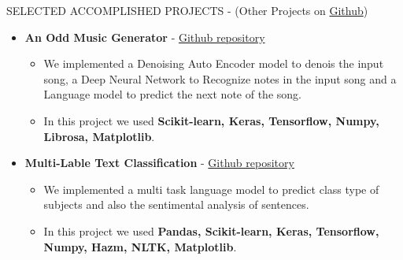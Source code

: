 \documentclass[]{CV}
\begin{document}
\begin{section}{SELECTED ACCOMPLISHED PROJECTS { - (Other Projects on \href{https://github.com/amirkasaei}{Github})}}
\begin{itemize}
\item \textbf{An Odd Music Generator} - \href{https://github.com/amirkasaei/An-Odd-Music-Generator}{Github repository}
   \begin{itemize}
        \item We implemented a Denoising Auto Encoder model to denois the input song, a Deep Neural Network to Recognize notes in the input song and a Language model to predict the next note of  the song.\vspace{-2mm}
        \item In this project we used \textbf{Scikit-learn, Keras, Tensorflow, Numpy, Librosa, Matplotlib}.
    \end{itemize} 
    
      
    
    
   \item \textbf{Multi-Lable Text Classification} - \href{https://github.com/amirkasaei/Multi-Lable-Text-Classification}{Github repository}
   \begin{itemize}
        \item We implemented a multi task language model to predict class type of subjects and also the sentimental analysis of sentences.\vspace{-2mm}
        \item In this project we used \textbf{Pandas, Scikit-learn, Keras, Tensorflow, Numpy, Hazm, NLTK, Matplotlib}.
    \end{itemize}


\end{itemize}
\end{section}
\end{document}

